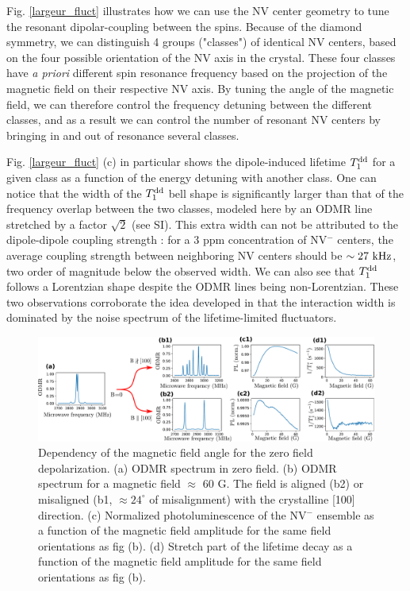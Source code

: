 \documentclass[preprintnumbers,amsmath,amssymb,superscriptaddress,twocolumn,showpacs]{revtex4-2}
\begin{document}
Fig. \ref{largeur_fluct} illustrates how we can use the NV center geometry to tune the resonant dipolar-coupling between the spins. Because of the diamond symmetry, we can distinguish 4 groups ("classes") of identical NV centers, based on the four possible orientation of the NV axis in the crystal. These four classes have \textit{a priori} different spin resonance frequency based on the projection of the magnetic field on their respective NV axis. By tuning the angle of the magnetic field, we can therefore control the frequency detuning between the different classes, and as a result we can control the number of resonant NV centers by bringing in and out of resonance several classes.

Fig. \ref{largeur_fluct} (c) in particular shows the dipole-induced lifetime $T_1^{\rm dd}$ for a given class as a function of the energy detuning with another class. One can notice that the width of the $T_1^{\rm dd}$ bell shape is significantly larger than that of the frequency overlap between the two classes, modeled here by an ODMR line stretched by a factor $\sqrt{2}$ (see SI). This extra width can not be attributed to the dipole-dipole coupling strength : for a 3 ppm concentration of NV$^-$ centers, the average coupling strength between neighboring NV centers should be $\sim 27\ \rm kHz$, two order of magnitude below the observed width. We can also see that $T_1^{\rm dd}$ follows a Lorentzian shape despite the ODMR lines being non-Lorentzian. These two observations corroborate the idea developed in \cite{choi_depolarization_2017} that the interaction width is dominated by the noise spectrum of the lifetime-limited fluctuators.

\begin{figure}
\includegraphics[width=.95\textwidth]{Figures/fig 100 vs 1x1x1x1}
\caption{Dependency of the magnetic field angle for the zero field depolarization. (a) ODMR spectrum in zero field. (b) ODMR spectrum for a magnetic field $\approx$ 60 G. The field is aligned (b2) or misaligned (b1, $\approx 24^\circ$ of misalignment) with the crystalline [100] direction. (c) Normalized photoluminescence of the NV$^-$ ensemble as a function of the magnetic field amplitude for the same field orientations as fig (b). (d) Stretch part of the lifetime decay as a function of the magnetic field amplitude for the same field orientations as fig (b).}
\label{100_VS_1x4}
\end{figure}
\end{document}
